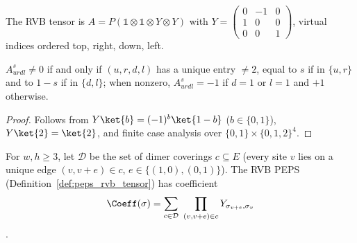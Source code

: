 \begin{definition}%
    \label{def:peps_rvb_tensor}
    \leanok
    The RVB tensor is $A=P(\mathbb{1}\otimes\mathbb{1}\otimes Y\otimes Y)$ with
    $Y=\left(\begin{smallmatrix}0&-1&0\\1&0&0\\0&0&1\end{smallmatrix}\right)$,
    virtual indices ordered top, right, down, left.
\end{definition}

\begin{lemma}%
    \label{lem:peps_rvb_local}
    \leanok
    $A^{s}_{urdl}\neq 0$ if and only if $(u,r,d,l)$ has a unique entry $\neq 2$,
    equal to $s$ if in $\{u,r\}$ and to $1-s$ if in $\{d,l\}$; when nonzero,
    $A^s_{urdl}=-1$ if $d=1$ or $l=1$ and $+1$ otherwise.
\end{lemma}

\begin{proof}\leanok
    Follows from $Y\ket{b}=(-1)^b\ket{1-b}$ ($b\in\{0,1\}$), $Y\ket{2}=\ket{2}$,
    and finite case analysis over $\{0,1\}\times\{0,1,2\}^4$.
\end{proof}

\begin{lemma}%
    \label{thm:peps_rvb_state}
    \leanok
    For $w,h\ge3$, let $\mathcal D$ be the set of dimer coverings $c\subseteq E$
    (every site $v$ lies on a unique edge $(v,v+e)\in c$, $e\in\{(1,0),(0,1)\}$).
    The RVB PEPS (Definition~\ref{def:peps_rvb_tensor}) has coefficient
    \begin{align}
        \Coeff(\sigma)=\sum_{c\in\mathcal D}\ \prod_{(v,v+e)\in c}Y_{\sigma_{v+e},\sigma_v}
        \notag
    \end{align}
    \cite[Appendix~A, ``The RVB state'']{Cirac2021Matrix}.
\end{lemma}

